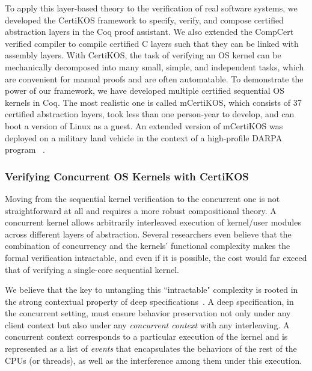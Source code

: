 \documentclass[a4paper, 10pt]{article}
\begin{document}
\begin{small}
To apply this layer-based theory to the verification of real software systems,
we developed the CertiKOS framework to  specify,  verify,  and compose certified abstraction layers  in the Coq proof assistant.
We also extended
the CompCert verified compiler to compile certified C layers such
that they can be linked with assembly layers.
With CertiKOS, the task of verifying an  OS kernel
can be mechanically decomposed into many small, simple, and
independent tasks, which are convenient for manual proofs and are often automatable.
To demonstrate the power of our  framework,
 we have developed multiple certified
sequential OS kernels in Coq. 
The most realistic one is called mCertiKOS,
which consists of 37 certified abstraction layers, 
took less than one person-year to develop,
and can boot a version of Linux as a guest.
An extended version of mCertiKOS was deployed on a military land vehicle in the context of a high-profile  DARPA program
~\cite{hacms}.

\subsubsection*{\small Verifying Concurrent OS Kernels with CertiKOS}
Moving from the sequential kernel verification
to the concurrent one is not straightforward at all
and requires a more robust compositional theory.
A concurrent kernel allows arbitrarily  interleaved
execution of kernel/user modules across different
layers of abstraction. 
Several researchers even believe that the combination of concurrency and the kernels' functional complexity makes the formal verification intractable,
and even if it is possible, the cost would far exceed that of
verifying a single-core sequential kernel.

We believe that the key to untangling this ``intractable" complexity is rooted in the
strong contextual property of deep specifications~\cite{osdi16-gu}.
A deep specification, in the concurrent setting, must ensure    behavior preservation not only under any client context but also under
any \emph{concurrent context} with any interleaving.
A  concurrent context corresponds to
a particular execution of the kernel  and is represented as a list of \emph{events} that encapsulates the behaviors of the rest of the CPUs (or threads), as well as the interference
among them under this  execution.


\end{small}
\end{document}
